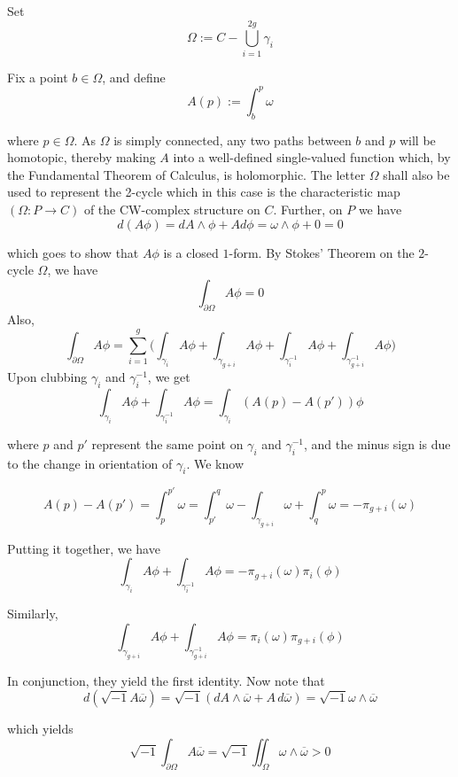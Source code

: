 \documentclass[11pt,a4paper]{article}
\begin{document}
    Set
    $$\Omega := C - \bigcup_{i = 1}^{2g} \gamma_i$$

Fix a point $b\in \Omega$, and define
$$A(p):= \int_{b}^{p}\omega$$

where $p \in \Omega$. As $\Omega$ is simply connected, any two paths between $b$ and $p$ will be homotopic, thereby making $A$ into a well-defined single-valued function which, by the Fundamental Theorem of Calculus, is holomorphic. The letter $\Omega$ shall also be used to represent the 2-cycle which in this case is the characteristic map $(\Omega: P \rightarrow C)$ of the CW-complex structure on $C$. Further, on $P$ we have
$$d(A\phi) = dA\wedge \phi + Ad\phi = \omega\wedge\phi + 0 = 0$$

which goes to show that $A\phi$ is a closed $1$-form. By Stokes' Theorem on the $2$-cycle $\Omega$, we have
$$\int_{\partial\Omega}A\phi = 0$$
Also,
$$\int_{\partial\Omega}A\phi = \sum_{i=1}^{g}\bigg(\int_{\gamma_i}A\phi + \int_{\gamma_{g+i}}A\phi + \int_{\gamma_i^{-1}}A\phi + \int_{\gamma_{g+i}^{-1}}A\phi\bigg)$$
Upon clubbing $\gamma_i$ and $\gamma_i^{-1}$, we get
$$\int_{\gamma_i}A\phi + \int_{\gamma_i^{-1}}A\phi = \int_{\gamma_i}(A(p) - A(p'))\phi$$

where $p$ and $p'$ represent the same point on $\gamma_i$ and $\gamma_i^{-1}$, and the minus sign is due to the change in orientation of $\gamma_i$. We know

$$A(p) - A(p') = \int_{p}^{p'}\omega = \int_{p'}^{q}\omega - \int_{\gamma_{g+i}}\omega + \int_{q}^{p}\omega = -\pi_{g+i}(\omega)$$

Putting it together, we have
$$\int_{\gamma_i}A\phi + \int_{\gamma_i^{-1}}A\phi = -\pi_{g+i}(\omega)\pi_{i}(\phi)$$

Similarly,
$$\int_{\gamma_{g+i}}A\phi + \int_{\gamma_{g+i}^{-1}}A\phi = \pi_{i}(\omega)\pi_{g+i}(\phi)$$

In conjunction, they yield the first identity. Now note that
$$d(\sqrt{-1}A\overline{\omega}) = \sqrt{-1}(dA\wedge \overline{\omega} + A\,d\overline{\omega}) = \sqrt{-1}\omega\wedge\overline{\omega}$$

which yields
$$\sqrt{-1}\int_{\partial\Omega}A\overline{\omega} = \sqrt{-1}\iint_{\Omega}\omega\wedge\overline{\omega} > 0$$
\end{document}
